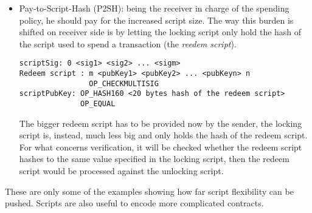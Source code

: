 \begin{itemize}[leftmargin=*]
\item Pay-to-Script-Hash (P2SH): being the receiver in charge of the spending policy, he should pay for the increased script size. The way this burden is shifted on receiver side is by letting the locking script only hold the hash of the script used to spend a transaction (the \textit{reedem script}).
\begin{lstlisting}[frame=single]
scriptSig: 0 <sig1> <sig2> ... <sigm>
Redeem script : m <pubKey1> <pubKey2> ... <pubKeyn> n 
                OP_CHECKMULTISIG 
scriptPubKey: OP_HASH160 <20 bytes hash of the redeem script> 
              OP_EQUAL
\end{lstlisting}
The bigger redeem script has to be provided now by the sender, the locking script is, instead, much less big and only holds the hash of the redeem script. For what concerns verification, it will be checked whether the redeem script hashes to the same value specified in the locking script, then the redeem script would be processed against the unlocking script.
\end{itemize}
These are only some of the examples showing how far script flexibility can be pushed. Scripts are also useful to encode more complicated contracts.